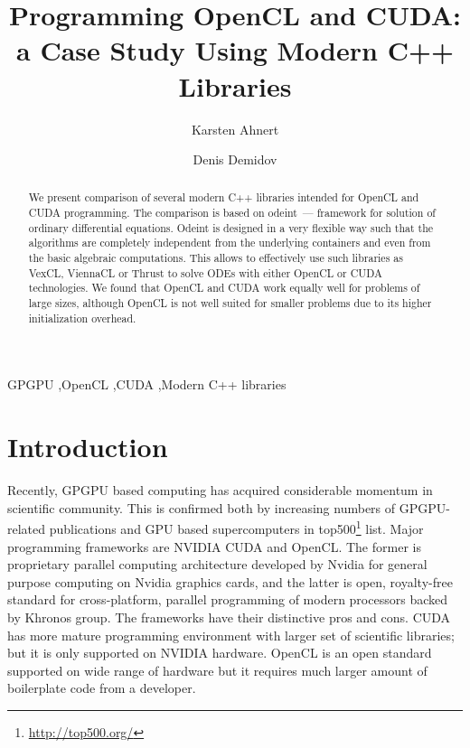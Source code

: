\documentclass[1p]{elsarticle}
\begin{document}
\begin{frontmatter}

\title{Programming OpenCL and CUDA:\\a Case Study Using Modern C++ Libraries}

\author{Karsten Ahnert}
\address{
Institut f\"ur Physik und Astronomie, Universit\"at Potsdam,\\
Karl-Liebknecht-Strasse 24/25, 14476 Potsdam-Golm, Germany
}

\author{Denis Demidov}
\address{
Kazan Branch of Joint Supercomputer Center,
Russian Academy of Sciences,\\
Lobachevsky st. 2/31, 420008 Kazan, Russia
}

\begin{abstract}
    We present comparison of several modern C++ libraries intended for OpenCL
    and CUDA programming. The comparison is based on odeint~--- framework for
    solution of ordinary differential equations. Odeint is designed in a very
    flexible way such that the algorithms are completely independent from the
    underlying containers and even from the basic algebraic computations. This
    allows to effectively use such libraries as VexCL, ViennaCL or Thrust to
    solve ODEs with either OpenCL or CUDA technologies. We found that OpenCL
    and CUDA work equally well for problems of large sizes, although OpenCL is
    not well suited for smaller problems due to its higher initialization
    overhead.
\end{abstract}

\begin{keyword}
    GPGPU \sep OpenCL \sep CUDA \sep Modern C++ libraries
\end{keyword}

\end{frontmatter}

\section{Introduction}

Recently, GPGPU based computing has acquired considerable momentum in
scientific community. This is confirmed both by increasing numbers of
GPGPU-related publications and GPU based supercomputers in
top500\footnote{\href{http://top500.org/}{http://top500.org/}} list. Major
programming frameworks are NVIDIA CUDA and OpenCL.  The former is proprietary
parallel computing architecture developed by Nvidia for general purpose
computing on Nvidia graphics cards, and the latter is open, royalty-free
standard for cross-platform, parallel programming of modern processors backed
by Khronos group. The frameworks have their distinctive pros and cons. CUDA has
more mature programming environment with larger set of scientific libraries;
but it is only supported on NVIDIA hardware. OpenCL is an open standard
supported on wide range of hardware but it requires much larger amount of
boilerplate code from a developer.
\end{document}
